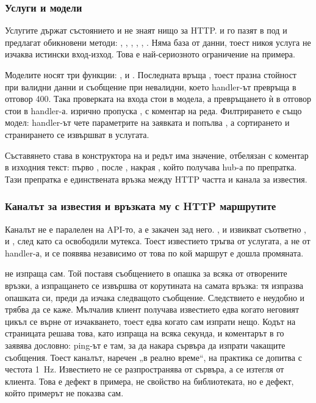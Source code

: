 \subsubsection{Услуги и модели}

Услугите държат състоянието и не знаят нищо за HTTP.  и
 го пазят в  под  и
предлагат обикновени методи: , , , ,
, . Няма база от данни, тоест никоя услуга не изчаква
истински вход-изход. Това е най-сериозното ограничение на примера.

Моделите носят три функции: ,  и
. Последната връща , тоест празна стойност
при валидни данни и съобщение при невалидни, което handler-ът превръща в отговор 400. Така
проверката на входа стои в модела, а превръщането ѝ в отговор стои в handler-а.
 изрично пропуска , с коментар на реда.
Филтрирането е също модел: handler-ът чете параметрите на заявката и попълва
, а сортирането и странирането се извършват в услугата.

Съставянето става в конструктора на  и редът има значение, отбелязан с
коментар в изходния текст: първо , после , накрая
, който получава hub-а по препратка. Тази препратка е единствената връзка
между HTTP частта и канала за известия.

\subsubsection{Каналът за известия и връзката му с HTTP маршрутите}

Каналът не е паралелен на API-то, а е закачен зад него. ,
 и  извикват съответно ,
 и , след като са освободили мутекса.
Тоест известието тръгва от услугата, а не от handler-а, и се появява независимо от това по
кой маршрут е дошла промяната.

 не изпраща сам. Той поставя съобщението в опашка за всяка от отворените
връзки, а изпращането се извършва от корутината на самата връзка: тя изпразва опашката си,
преди да изчака следващото съобщение. Следствието е неудобно и трябва да се каже. Мълчалив
клиент получава известието едва когато неговият цикъл се върне от изчакването, тоест едва
когато сам изпрати нещо. Кодът на
страницата решава това, като изпраща  на всяка секунда, и коментарът в
 го заявява дословно: ping-ът е там, за да накара сървъра да изпрати
чакащите съобщения. Тоест каналът, наречен „в реално време“, на практика се допитва с
честота 1~Hz. Известието не се разпространява от сървъра, а се изтегля от клиента. Това е
дефект в примера, не свойство на библиотеката, но е дефект, който примерът не показва сам.

